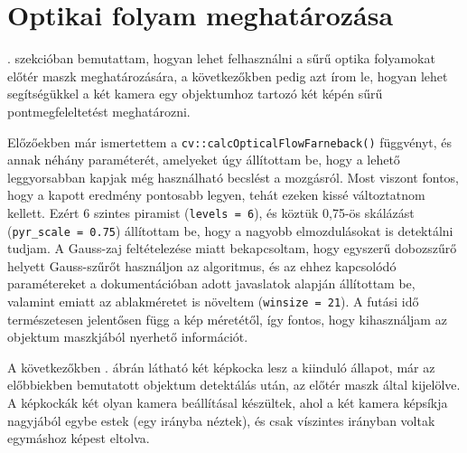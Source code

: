 \section{Optikai folyam meghatározása}

. szekcióban bemutattam, hogyan lehet felhasználni a sűrű optika folyamokat előtér maszk meghatározására, a következőkben pedig azt írom le, hogyan lehet segítségükkel a két kamera egy objektumhoz tartozó két képén sűrű pontmegfeleltetést meghatározni.

Előzőekben már ismertettem a \texttt{cv::calcOpticalFlowFarneback()} függvényt, és annak néhány paraméterét, amelyeket úgy állítottam be, hogy a lehető leggyorsabban kapjak még használható becslést a mozgásról. Most viszont fontos, hogy a kapott eredmény pontosabb legyen, tehát ezeken kissé változtatnom kellett. Ezért 6 szintes piramist (\texttt{levels = 6}), és köztük 0,75-ös skálázást (\texttt{pyr\_scale = 0.75}) állítottam be, hogy a nagyobb elmozdulásokat is detektálni tudjam. A Gauss-zaj feltételezése miatt bekapcsoltam, hogy egyszerű dobozszűrő helyett Gauss-szűrőt használjon az algoritmus, és az ehhez kapcsolódó paramétereket a dokumentációban adott javaslatok alapján állítottam be, valamint emiatt az ablakméretet is növeltem (\texttt{winsize = 21}). A futási idő természetesen jelentősen függ a kép méretétől, így fontos, hogy kihasználjam az objektum maszkjából nyerhető információt.

A következőkben . ábrán látható két képkocka lesz a kiinduló állapot, már az előbbiekben bemutatott objektum detektálás után, az előtér maszk által kijelölve. A képkockák két olyan kamera beállításal készültek, ahol a két kamera képsíkja nagyjából egybe estek (egy irányba néztek), és csak víszintes irányban voltak egymáshoz képest eltolva.

